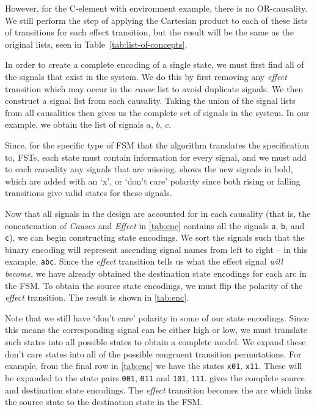 However, for the C-element with environment example, there is no OR-causality. 
We still perform the step of applying the Cartesian product to each of these 
lists of transitions for each effect transition, but the result will be the 
same as the original lists, seen in Table~\ref{tab:list-of-concepts}.

In order to create a complete encoding of a single state, we must first find all of the signals that exist in the system.
We do this by first removing any \emph{effect} transition which may occur in the \emph{cause} list to avoid duplicate signals.
We then construct a signal list from each causality.
Taking the union of the signal lists from all causalities then gives us the complete set of signals in the system.
In our example, we obtain the list of signals $a$, $b$, $c$.

Since, for the specific type of FSM that the algorithm translates the specification to, FSTs, each state must contain information for every signal, 
and we must add to each causality any signals that are missing.
 shows the new signals in bold, which are added with an `x', or `don't care' polarity since both rising or falling transitions give valid states for these signals.

Now that all signals in the design are accounted for in each causality (that is, the concatenation of \emph{Causes} and \emph{Effect} in \cref{tab:enc} contains all the signals \texttt{a}, \texttt{b}, and \texttt{c}), we can begin constructing state encodings.
We sort the signals such that the binary encoding will represent ascending signal names from left to right -- in this example, \texttt{abc}.
Since the \emph{effect} transition tells us what the effect signal \emph{will become}, we have already obtained the destination state encodings for each arc in the FSM\@.
To obtain the source state encodings, we must flip the polarity of the \emph{effect} transition.
The result is shown in \cref{tab:enc}.

Note that we still have `don't care' polarity in some of our state encodings.
Since this means the corresponding signal can be either high or low, we must translate such states into all possible states to obtain a complete model\@.
We expand these don't care states into all of the possible congruent transition permutations.
For example, from the final row in \cref{tab:enc} we have the states \texttt{x01}, \texttt{x11}.
These will be expanded to the state pairs \texttt{001}, \texttt{011} and \texttt{101}, \texttt{111}.
 gives the complete source and destination state encodings.
The \emph{effect} transition becomes the arc which links the source state to the destination state in the FSM\@.

